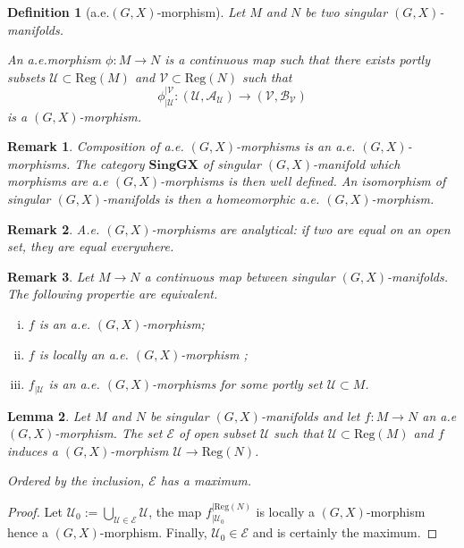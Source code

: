 \documentclass[a4paper,12pt]{article}
\newtheorem{lem}{Lemma}[section]          %
\newtheorem{defi}[lem]{Definition}    %
\newtheorem{rem}{Remark}             %
\def\U{\mathcal U}
\def\V{\mathcal V}
\def\A{\mathcal A}
\def\Reg{\mathrm{Reg}}
\def\reg{\Reg}
\def\V{\mathcal V}
\def\reg{\mathrm{Reg}}
\def\U{\mathcal{U}}
\def\Reg{\mathrm{Reg}}
\def\A{\mathcal A}
\def\B{\mathcal B}
\def\CatSingGX{\mathbf{SingGX}}
\begin{document}
                    
					\begin{defi}[a.e.$(G,X)$-morphism]\label{def:morphism} Let
					$M$ and $N$ be two singular $(G,X)$-manifolds.

					An a.e.morphism $\phi:M\rightarrow N$ is a continuous map such that there exists portly subsets $\U\subset \reg(M)$ and $\V\subset \reg(N)$ such that
					$$\phi_{|\U}^{|\V}:(\U,\A_\U)\rightarrow (\V,\B_\V)$$ is a $(G,X)$-morphism.
					\end{defi}

					\begin{rem}\label{rem:composition_morphisms_morphisms_category} Composition of a.e. $(G,X)$-morphisms is an a.e. $(G,X)$-morphisms. The category $\CatSingGX$ of singular $(G,X)$-manifold which morphisms are a.e $(G,X)$-morphisms is then well defined. 
					An isomorphism of singular $(G,X)$-manifolds is then a homeomorphic a.e. $(G,X)$-morphism.
					\end{rem}

                    \begin{rem}\label{rem:morphisms_analytical_two_equal} A.e. $(G,X)$-morphisms are analytical: if two are equal on an open set, they are equal everywhere.
                     
                    \end{rem}

					
					
					\begin{rem}\label{prop:GX_sing_morph_local}
					Let $M\rightarrow N$ a continuous map between singular $(G,X)$-manifolds.
					The following propertie are equivalent.
					\begin{enumerate}[(i)]
					 \item $f$ is an a.e. $(G,X)$-morphism;
					 \item $f$ is locally an a.e. $(G,X)$-morphism ;
					 \item $f_{|\U}$ is an a.e. $(G,X)$-morphisms for some portly set $\U\subset M$.
					\end{enumerate}
					\end{rem}

                \begin{lem}\label{lem:singular_manifolds_morphism_set} 
                   Let $M$ and $N$ be singular $(G,X)$-manifolds and let $f:M\rightarrow N$ an a.e $(G,X)$-morphism. 
                   The set $\mathcal E$ of open subset $\U$ such that $\U\subset \reg(M)$ and $f$ induces a $(G,X)$-morphism $\U\rightarrow \reg(N)$.   
                   
                   Ordered by the inclusion, $\mathcal E$ has a maximum.
                    
                \end{lem}
                \begin{proof}
                  Let $\U_0:=\bigcup_{\U\in \mathcal E}\U$, the map $f_{|\U_0}^{|\reg(N)}$ is locally a $(G,X)$-morphism hence a $(G,X)$-morphism. Finally, $\U_0\in \mathcal E$ and is certainly the maximum.
                \end{proof}
\end{document}
